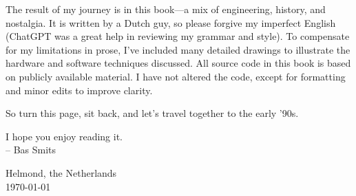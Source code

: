\documentclass[book.tex]{subfiles}
\begin{document}
\par
The result of my journey is in this book---a mix of engineering, history, and nostalgia. It is written by a Dutch guy, so please forgive my imperfect English (ChatGPT was a great help in reviewing my grammar and style).  To compensate for my limitations in prose, I’ve included many detailed drawings to illustrate the hardware and software techniques discussed. All source code in this book is based on publicly available material. I have not altered the code, except for formatting and minor edits to improve clarity.\\

\par
So turn this page, sit back, and let’s travel together to the early ’90s.\\

\par
I hope you enjoy reading it.\\

-- Bas Smits\\
\par
Helmond, the Netherlands\\
\monthyeardate\today\\
\end{document}
